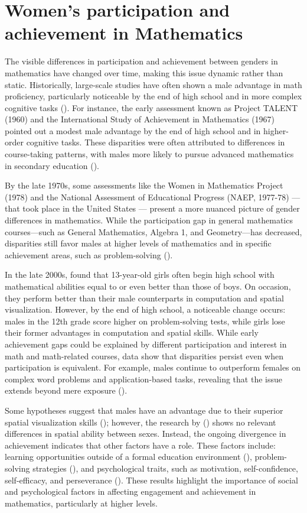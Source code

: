 \section{Women's participation and achievement in Mathematics}
The visible differences in participation and achievement between genders in mathematics have changed over time, making this issue dynamic rather than static.
Historically, large-scale studies have often shown a male advantage in math proficiency, particularly noticeable by the end of high school and in more complex cognitive tasks (\cite{LiuWilson2009}). For instance, the early assessment known as Project TALENT (1960) and the International Study of Achievement in Mathematics (1967) pointed out a modest male advantage by the end of high school and in higher-order cognitive tasks. These disparities were often attributed to differences in course-taking patterns, with males more likely to pursue advanced mathematics in secondary education (\cite{Armstrong}).

By the late 1970s, some assessments like the Women in Mathematics Project (1978) and the National Assessment of Educational Progress (NAEP, 1977-78) — that took place in the United States — present a more nuanced picture of gender differences in mathematics. While the participation gap in general mathematics courses—such as General Mathematics, Algebra 1, and Geometry—has decreased, disparities still favor males at higher levels of mathematics and in specific achievement areas, such as problem-solving (\cite{Armstrong}).

In the late 2000s, \textcite{Zel} found that 13-year-old girls often begin high school with mathematical abilities equal to or even better than those of boys. On occasion, they perform better than their male counterparts in computation and spatial visualization. However, by the end of high school, a noticeable change occurs: males in the 12th grade score higher on problem-solving tests, while girls lose their former advantages in computation and spatial skills. While early achievement gaps could be explained by different participation and interest in math and math-related courses, data show that disparities persist even when participation is equivalent. For example, males continue to outperform females on complex word problems and application-based tasks, revealing that the issue extends beyond mere exposure (\cite{Zel}).

Some hypotheses suggest that males have an advantage due to their superior spatial visualization skills (\cite{RamirezUcles2020}); however, the research by (\cite{FennemaTartre1985}) shows no relevant differences in spatial ability between sexes. Instead, the ongoing divergence in achievement indicates that other factors have a role. These factors include: learning opportunities outside of a formal education environment (\cite{Boeren2011}), problem-solving strategies (\cite{RamirezUcles2020}), and psychological traits, such as motivation, self-confidence, self-efficacy, and perseverance (\cite{Rodriguez2020}). These results highlight the importance of social and psychological factors in affecting engagement and achievement in mathematics, particularly at higher levels.

